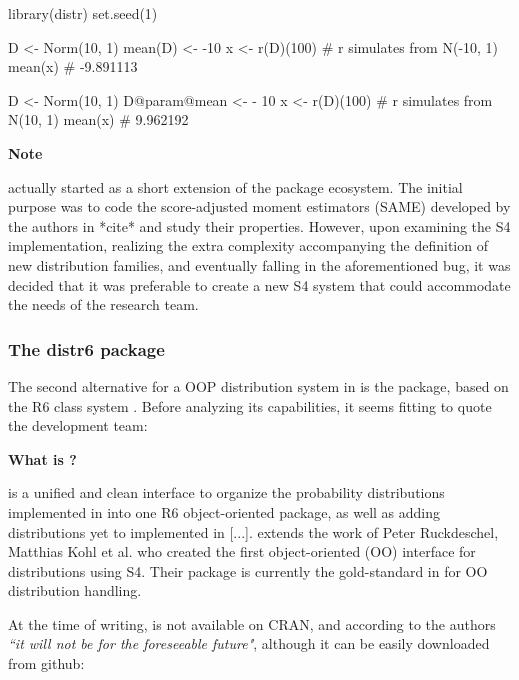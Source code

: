 \documentclass[nojss]{jss}
\begin{document}
\begin{CodeChunk}
\begin{CodeInput}
library(distr)
set.seed(1)

D <- Norm(10, 1)
mean(D) <- -10
x <- r(D)(100) # r simulates from N(-10, 1)
mean(x) # -9.891113

D <- Norm(10, 1)
D@param@mean <- - 10
x <- r(D)(100) # r simulates from N(10, 1)
mean(x) # 9.962192
\end{CodeInput}
\end{CodeChunk}

\begin{leftbar}
\textbf{Note}

 actually started as a short extension of the  package ecosystem. The initial purpose was to code the score-adjusted moment estimators (SAME) developed by the authors in *cite* and study their properties. However, upon examining the S4 implementation, realizing the extra complexity accompanying the definition of new distribution families, and eventually falling in the aforementioned bug, it was decided that it was preferable to create a new S4 system that could accommodate the needs of the research team.
\end{leftbar}

\subsubsection[The distr6 package]{The distr6 package}\label{ss:distr6}

The second alternative for a OOP distribution system in  is the  package, based on the R6 class system \citep{distr6}. Before analyzing its capabilities, it seems fitting to quote the  development team:

\begin{leftbar}
\textbf{What is ?}

 is a unified and clean interface to organize the probability distributions implemented in  into one R6 object-oriented package, as well as adding distributions yet to implemented in  [...].  extends the work of Peter Ruckdeschel, Matthias Kohl et al. who created the first object-oriented (OO) interface for distributions using S4. Their  package is currently the gold-standard in  for OO distribution handling.
\end{leftbar}

At the time of writing,  is not available on CRAN, and according to the authors \emph{``it will not be for the foreseeable future"}, although it can be easily downloaded from github:
\end{document}
